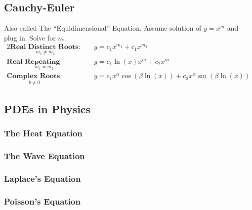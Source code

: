 \subsection*{Cauchy-Euler}
    Also called The ``Equidimensional'' Equation. Assume solution of $y=x^m$ and plug in. Solve for $m$.
    \begin{alignat}{2}
        \underset { m_1 \neq m_2}{\textbf{Real Distinct Roots:}}
        &\quad y=c_1x^{m_1}+c_1x^{m_2}\\[0.7 cm]
        \underset{m_1=m_2}{\textbf{Real Repeating Roots:}}
        &\quad y=c_1\ln(x)x^m+c_2x^m\\[0.7 cm]
        \underset{b \neq 0}{\textbf{Complex Roots:}}
        &\quad y=c_{1}x^{\alpha }\cos(\beta \ln(x))+c_{2}x^{\alpha }\sin(\beta \ln(x))
    \end{alignat}
\subsection{PDEs in Physics}
    \subsubsection{The Heat Equation} %
    \subsubsection{The Wave Equation} %
    \subsubsection{Laplace's Equation} %
    \subsubsection{Poisson's Equation} %
%